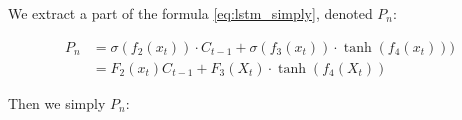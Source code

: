 We extract a part of the formula \ref{eq:lstm_simply}, denoted $P_n$:


\begin{equation}\begin{aligned}P_n&=\sigma(f_2(x_t))\cdot C_{t-1}+\sigma(f_3(x_t))\cdot\tanh(f_4(x_t)))\\&=F_2(x_t)C_{t-1}+F_3(X_t)\cdot\tanh(f_4(X_t))\end{aligned}\end{equation}


Then we simply $P_n$:

